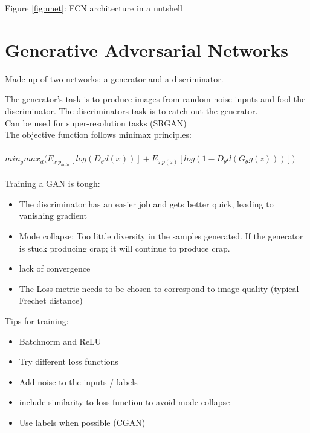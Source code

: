 \documentclass[]{article}
\begin{document}
		\begin{center}
			Figure \ref{fig:unet}: FCN architecture in a nutshell
		\end{center}
			
\section{Generative Adversarial Networks}

Made up of two networks: a generator and a discriminator.

The generator's task is to produce images from random noise inputs and fool the discriminator. The discriminators task is to catch out the generator.\\

Can be used for super-resolution tasks (SRGAN)\\

The objective function follows minimax principles:\\
\\
$min_g max_d \big( E_{x~p_{data}} [log(D_\theta d (x))] + 	E_{z~p(z)}[ log(1-D_\theta d (G_\theta g (z)))] \big)$\\
\\
\textnormal{Training a GAN is tough:}
\begin{itemize}
	\item The discriminator has an easier job and gets better quick, leading to vanishing gradient
	\item Mode collapse: Too little diversity in the samples generated. If the generator is stuck producing crap; it will continue to produce crap.
	\item lack of convergence
	\item The Loss metric needs to be chosen to correspond to image quality (typical Frechet distance)\\
\end{itemize}
\newpage
\textnormal{Tips for training:}

\begin{itemize}
	\item Batchnorm and ReLU
	\item Try different loss functions
	\item Add noise to the inputs / labels
	\item include similarity to loss function to avoid mode collapse
	\item Use labels when possible (CGAN)
\end{itemize}
	
\end{document}
